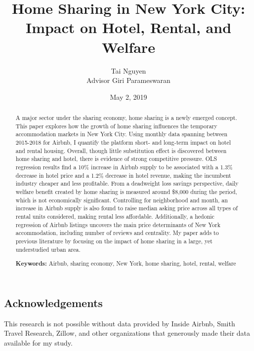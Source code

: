\documentclass[12pt]{article}
\title{Home Sharing in New York City: Impact on Hotel, Rental, and Welfare}
\author{Tai Nguyen\\
Advisor Giri Parameswaran} %
\date{May 2, 2019} %
\affil{Department of Economics, Haverford College}
\begin{document}
 
	\begin{singlespace} %
	\clearpage\maketitle %
	\thispagestyle{empty} %
	
	\begin{doublespace}
	\begin{abstract} %
		A major sector under the sharing economy, home sharing is a newly emerged concept. This paper explores how the growth of home sharing influences the temporary accommodation markets in New York City. Using monthly data spanning between 2015-2018 for Airbnb, I quantify the platform short- and long-term impact on hotel and rental housing. Overall, though little substitution effect is discovered between home sharing and hotel, there is evidence of strong competitive pressure. OLS regression results find a 10\% increase in Airbnb supply to be associated with a 1.3\% decrease in hotel price and a 1.2\% decrease in hotel revenue, making the incumbent industry cheaper and less profitable. From a deadweight loss savings perspective, daily welfare benefit created by home sharing is measured around \$8,000 during the period, which is not economically significant. Controlling for neighborhood and month, an increase in Airbnb supply is also found to raise median asking price across all types of rental units considered, making rental less affordable. Additionally, a hedonic regression of Airbnb listings uncovers the main price determinants of New York accommodation, including number of reviews and centrality. My paper adds to previous literature by focusing on the impact of home sharing in a large, yet understudied urban area.
		 
		\noindent\textbf{Keywords:} Airbnb, sharing economy, New York, home sharing, hotel, rental, welfare\\
	\end{abstract}
	\clearpage
	
	\begin{frame}{}
		\section*{\centering Acknowledgements}
			\indent
			This research is not possible without data provided by Inside Airbnb, Smith Travel Research, Zillow, and other organizations that generously made their data available for my study.\\
			

\end{frame}
\end{doublespace}
\end{singlespace}
\end{document}
